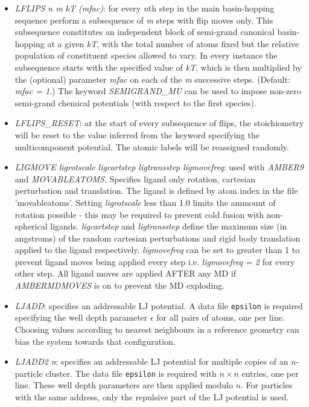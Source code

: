 \documentclass[12pt,a4paper,dvips]{article}
\begin{document}
\begin{itemize}
\item {\it LFLIPS n m kT (mfac)\/}: for every {\it n}th step in the main basin-hopping sequence perform a subsequence of {\it m} steps with flip moves only. This subsequence constitutes an independent block of semi-grand canonical basin-hopping at a given {\it kT}, with the total number of atoms fixed but the relative population of constituent species allowed to vary. In every instance the subsequence starts with the specified value of {\it kT}, which is then multiplied by the (optional) parameter {\it mfac} on each of the {\it m} successive steps. (Default: {\it mfac = 1}.) The keyword {\it SEMIGRAND\_MU} can be used to impose non-zero semi-grand chemical potentials (with respect to the first species). 

\item {\it LFLIPS\_RESET\/}: at the start of every subsequence of flips, the stoichiometry will be reset to the value inferred from the keyword specifying the multicomponent potential. The atomic labels will be reassigned randomly.

\item {\it LIGMOVE ligrotscale ligcartstep ligtransstep ligmovefreq\/}: used with {\it AMBER9\/} and {\it MOVABLEATOMS}. Specifies ligand only rotation, cartesian perturbation and translation. The ligand is defined by atom index in the file 'movableatoms'. Setting {\it ligrotscale} less than 1.0
limits the ammount of rotation possible - this may be required to prevent cold fusion with non-spherical ligands. {\it ligcartstep} and {\it ligtransstep} 
define the maximum size (in angstroms) of the random cartesian perturbations and rigid body translation applied to the ligand respectively. 
{\it ligmovefreq} can be set to greater than 1 to prevent ligand moves being applied every step i.e. {\it ligmovefreq = 2} for every other step.
All ligand moves are applied AFTER any MD if {\it AMBERMDMOVES} is on to prevent the MD exploding.    

\item {\it LJADD\/}: specifies an addressable LJ potential. A data file {\tt epsilon} is required
specifying the well depth parameter $\epsilon$ for all pairs of atoms, one per line.
Choosing values according to nearest neighbours in a reference geometry can bias the
system towards that configuration.

\item {\it LJADD2 n\/}: specifies an addressable LJ potential for multiple copies of an $n$-particle
cluster. The data file {\tt epsilon} is required
with $n\times n$ entries, one per line. These well depth parameters are then applied modulo $n$.
For particles with the same address, only the repulsive part of the LJ potential is used.



\end{itemize}
\end{document}
